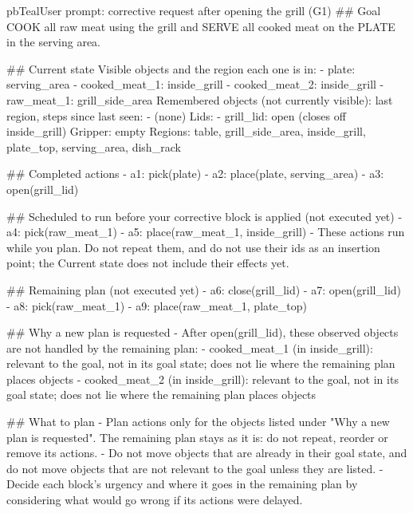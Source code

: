 \begin{promptbox}{pbTeal}{User prompt: corrective request after opening the grill (G1)}
## Goal
COOK all raw meat using the grill and SERVE all cooked meat on the PLATE in the serving area.

## Current state
Visible objects and the region each one is in:
- plate: serving_area
- cooked_meat_1: inside_grill
- cooked_meat_2: inside_grill
- raw_meat_1: grill_side_area
Remembered objects (not currently visible): last region, steps since last seen:
- (none)
Lids:
- grill_lid: open (closes off inside_grill)
Gripper: empty
Regions: table, grill_side_area, inside_grill, plate_top, serving_area, dish_rack

## Completed actions
- a1: pick(plate)
- a2: place(plate, serving_area)
- a3: open(grill_lid)

## Scheduled to run before your corrective block is applied (not executed yet)
- a4: pick(raw_meat_1)
- a5: place(raw_meat_1, inside_grill)
- These actions run while you plan. Do not repeat them, and do not use their ids as an insertion point; the Current state does not include their effects yet.

## Remaining plan (not executed yet)
- a6: close(grill_lid)
- a7: open(grill_lid)
- a8: pick(raw_meat_1)
- a9: place(raw_meat_1, plate_top)

## Why a new plan is requested
- After open(grill_lid), these observed objects are not handled by the remaining plan:
  - cooked_meat_1 (in inside_grill): relevant to the goal, not in its goal state; does not lie where the remaining plan places objects
  - cooked_meat_2 (in inside_grill): relevant to the goal, not in its goal state; does not lie where the remaining plan places objects

## What to plan
- Plan actions only for the objects listed under "Why a new plan is requested". The remaining plan stays as it is: do not repeat, reorder or remove its actions.
- Do not move objects that are already in their goal state, and do not move objects that are not relevant to the goal unless they are listed.
- Decide each block's urgency and where it goes in the remaining plan by considering what would go wrong if its actions were delayed.
\end{promptbox}
